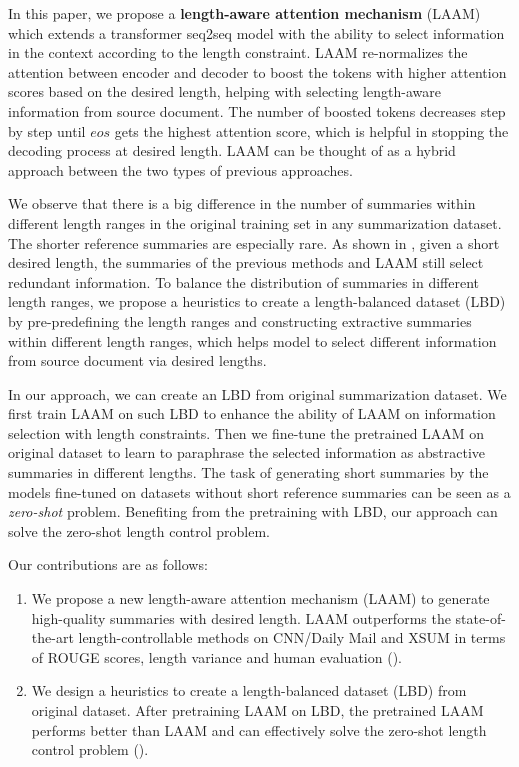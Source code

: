 In this paper,
we propose a {\bf length-aware attention mechanism} (LAAM) 
which extends a transformer seq2seq model with the ability to 
select information in the context according to the length constraint. 
LAAM re-normalizes the attention between encoder and decoder to boost the tokens with higher attention scores based on the desired length, helping with selecting length-aware information from source document.
The number of boosted tokens decreases step by step until $eos$ gets 
the highest attention score, which is helpful in stopping the decoding process 
at desired length.
LAAM can be thought of as a hybrid approach between the two types of previous approaches.

We observe that there is a big difference in the number of summaries 
within different length ranges in the original training set in any
summarization dataset. 
The shorter reference summaries are especially rare.
As shown in ,
given a short desired length, the summaries of
the previous methods and LAAM still select redundant information.
To balance the distribution of summaries in different length ranges, we 
propose a heuristics to create a length-balanced dataset (LBD)
by pre-predefining the length ranges and constructing extractive summaries within different length ranges, which helps model to select different information from source document via desired lengths. 

In our approach, we can create an LBD from original summarization dataset. 
We first train 
LAAM on such LBD to enhance the ability of 
LAAM on information selection with length constraints. 
Then we fine-tune the pretrained LAAM on
original dataset to learn to paraphrase
the selected information as abstractive summaries in different lengths.
The task of generating short summaries by the models fine-tuned on datasets without short reference summaries can be seen as a {\em zero-shot} problem.
Benefiting from the pretraining with LBD, our approach can solve the zero-shot length control problem.

Our contributions are as follows:

\begin{enumerate}
\item We propose a new length-aware attention mechanism (LAAM) to generate high-quality summaries with desired length. %
LAAM outperforms the state-of-the-art length-controllable methods 
on CNN/Daily Mail and XSUM in terms of ROUGE scores, length variance and human evaluation ().
\item We design a heuristics to create a length-balanced dataset (LBD) from original dataset. After pretraining LAAM on LBD, the pretrained LAAM performs better than LAAM and can effectively solve the zero-shot length control problem
().
\end{enumerate}

